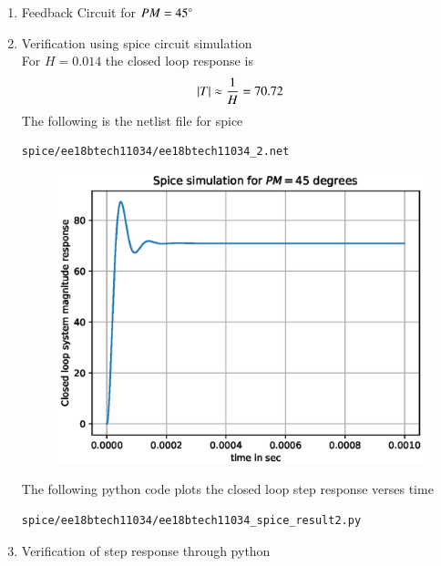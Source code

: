 \begin{enumerate}[label=\arabic*.,ref=\theenumi]
\item Feedback Circuit for $PM = 45\degree$\\
\solution
\begin{figure}[ht!]
	\begin{center}
		\resizebox{\columnwidth}{!}{}
	\end{center}
	\caption{}
	\label{fig:ee18btech11034_fige}
\end{figure}
\item Verification using spice circuit simulation\\
\solution For $H=0.014$ the closed loop response is
\begin{align}
\left\vert T\right\vert \approx \frac{1}{H} = 70.72
\end{align}
The following is the netlist file for spice
\begin{lstlisting}
spice/ee18btech11034/ee18btech11034_2.net
\end{lstlisting}
\begin{figure}[!h]
\centering
\includegraphics[width=\columnwidth]{./figs/ee18btech11034/ee18btech11034_spice_result2.eps}
\caption{}
\label{fig:ee18btech11034_spice_result2}
\end{figure}
The following python code plots the closed loop step response verses time
\begin{lstlisting}
spice/ee18btech11034/ee18btech11034_spice_result2.py
\end{lstlisting}
\item Verification of step response through python

\end{enumerate}

